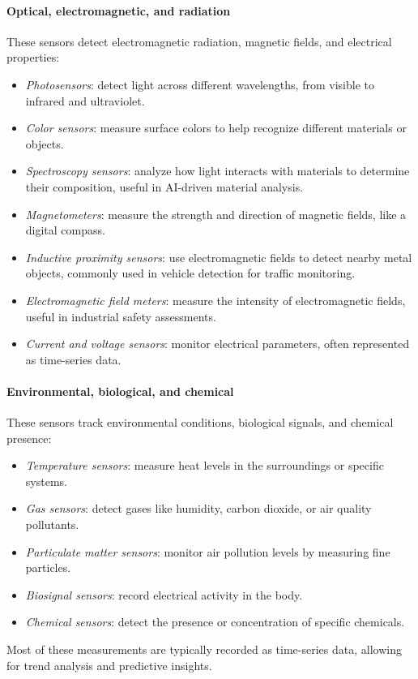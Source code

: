 \paragraph*{Optical, electromagnetic, and radiation}
These sensors detect electromagnetic radiation, magnetic fields, and electrical properties:
\begin{itemize}
    \item \textit{Photosensors}: detect light across different wavelengths, from visible to infrared and ultraviolet.
    \item \textit{Color sensors}: measure surface colors to help recognize different materials or objects.
    \item \textit{Spectroscopy sensors}: analyze how light interacts with materials to determine their composition, useful in AI-driven material analysis.
    \item \textit{Magnetometers}: measure the strength and direction of magnetic fields, like a digital compass.
    \item \textit{Inductive proximity sensors}: use electromagnetic fields to detect nearby metal objects, commonly used in vehicle detection for traffic monitoring.
    \item \textit{Electromagnetic field meters}: measure the intensity of electromagnetic fields, useful in industrial safety assessments.
    \item \textit{Current and voltage sensors}: monitor electrical parameters, often represented as time-series data.
\end{itemize}

\paragraph*{Environmental, biological, and chemical}
These sensors track environmental conditions, biological signals, and chemical presence:
\begin{itemize}
    \item \textit{Temperature sensors}: measure heat levels in the surroundings or specific systems.
    \item \textit{Gas sensors}: detect gases like humidity, carbon dioxide, or air quality pollutants.
    \item \textit{Particulate matter sensors}: monitor air pollution levels by measuring fine particles.
    \item \textit{Biosignal sensors}: record electrical activity in the body.
    \item \textit{Chemical sensors}: detect the presence or concentration of specific chemicals.
\end{itemize}
\noindent Most of these measurements are typically recorded as time-series data, allowing for trend analysis and predictive insights.